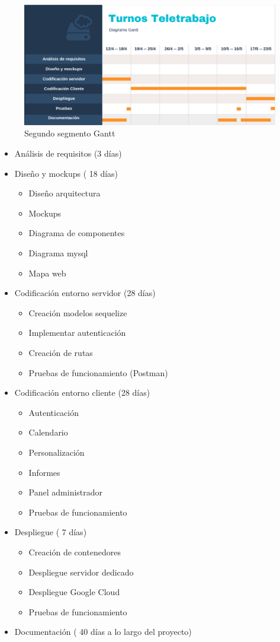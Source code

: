 \documentclass[11pt,spanish,listoffigures,listoftables]{tfgetsinf}
\begin{document}
 \begin{figure}[h!] %
   \includegraphics[width=\linewidth]{img/gantt2.png}
   \caption{Segundo segmento Gantt}
   \label{fig:Gantt21}
 \end{figure}

\begin{itemize}
   \item Análisis de requisitos  (3 días)  
   \item Diseño y mockups ( 18 días)
   \begin{itemize}
      \item Diseño arquitectura
      \item Mockups
      \item Diagrama de componentes
      \item Diagrama mysql
      \item Mapa web
   \end{itemize}
   \item Codificación entorno servidor (28 días)
   \begin{itemize}
      \item Creación modelos sequelize
      \item Implementar autenticación
      \item Creación de rutas
      \item Pruebas de funcionamiento (Postman)
   \end{itemize}
   \item Codificación entorno cliente (28 días)
   \begin{itemize}
      \item Autenticación
      \item Calendario
      \item Personalización
      \item Informes
      \item Panel administrador
      \item Pruebas de funcionamiento
   \end{itemize}
   \item Despliegue ( 7 días)
   \begin{itemize}
      \item Creación de contenedores
      \item Despliegue servidor dedicado
      \item Despliegue Google Cloud
      \item Pruebas de funcionamiento
   \end{itemize}
   \item Documentación ( 40 días a lo largo del proyecto)
\end{itemize}
\end{document}
